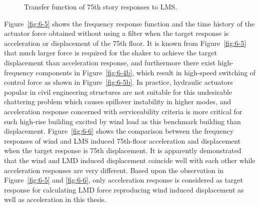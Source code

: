 \begin{figure}[!ht]
\centering
{}
\caption{Transfer function of 75th story responses to LMS.}
\label{fig:6-4}
\end{figure}

Figure~\ref{fig:6-5} shows the frequency response function and the time history of the actuator force obtained without using a filter when the target response is acceleration or displacement of the 75th floor. It is known from Figure~\ref{fig:6-5} that much larger force is required for the shaker to achieve the target displacement than acceleration response, and furthermore there exist high-frequency components in Figure~\ref{fig:6-4b}, which result in high-speed switching of control force as shown in Figure~\ref{fig:6-5b}. In practice, hydraulic actuators popular in civil engineering structures are not suitable for this undesirable chattering problem which causes spillover instability in higher modes, and acceleration response concerned with serviceability criteria is more critical for such high-rise building excited by wind load as this benchmark building than displacement. 
Figure~\ref{fig:6-6} shows the comparison between the frequency responses of wind and LMS induced 75th-floor acceleration and displacement when the target response is 75th displacement. It is apparently demonstrated that the wind and LMD induced displacement coincide well with each other while acceleration responses are very different. Based upon the observation in Figure~\ref{fig:6-5} and  \ref{fig:6-6}, only acceleration response is considered as target response for calculating LMD force reproducing wind induced displacement as well as acceleration in this thesis.

